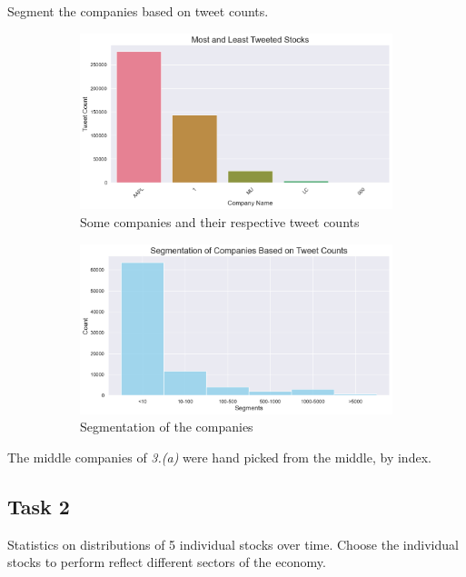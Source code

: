 \documentclass[12pt]{article}
\begin{document}
\begin{qsolve}[Task]
    Segment the companies based on tweet counts.
\end{qsolve}

\begin{figure}[h!]
    \centering
    \begin{subfigure}{.5\textwidth}
        \centering
        \includegraphics[width=.7\textwidth]{P1.1.2.png}
        \caption{Some companies and their respective tweet counts}
        \label{fig:1.1.2}
    \end{subfigure}%
    \begin{subfigure}{.5\textwidth}
        \centering
        \includegraphics[width=.7\textwidth]{P1.1.3.png}
        \caption{Segmentation of the companies}
        \label{fig:1.1.3}
    \end{subfigure}
    \caption{}
\end{figure}

The middle companies of \textit{3.(a)} were 
hand picked from the middle, by index.

\pagebreak

\subsection{Task 2}

\begin{qsolve}[Task]
    Statistics on distributions of 5 individual 
    stocks over time. Choose the individual stocks to 
    perform reflect different sectors of the economy.
\end{qsolve}
\end{document}
